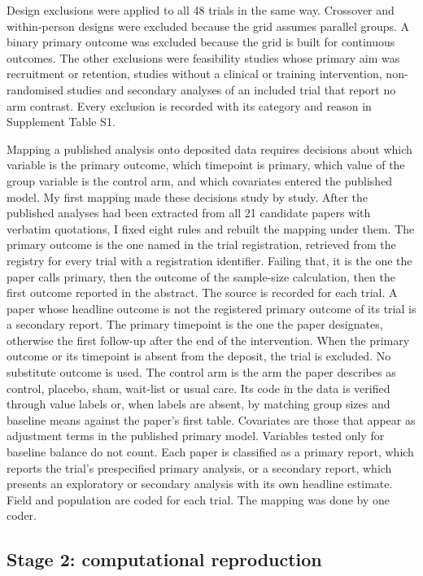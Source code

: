 Design exclusions were applied to all 48 trials in the same way. Crossover and within-person designs were excluded because the grid assumes parallel groups. A binary primary outcome was excluded because the grid is built for continuous outcomes. The other exclusions were feasibility studies whose primary aim was recruitment or retention, studies without a clinical or training intervention, non-randomised studies and secondary analyses of an included trial that report no arm contrast. Every exclusion is recorded with its category and reason in Supplement Table S1.

Mapping a published analysis onto deposited data requires decisions about which variable is the primary outcome, which timepoint is primary, which value of the group variable is the control arm, and which covariates entered the published model. My first mapping made these decisions study by study. After the published analyses had been extracted from all 21 candidate papers with verbatim quotations, I fixed eight rules and rebuilt the mapping under them. The primary outcome is the one named in the trial registration, retrieved from the registry for every trial with a registration identifier. Failing that, it is the one the paper calls primary, then the outcome of the sample-size calculation, then the first outcome reported in the abstract. The source is recorded for each trial. A paper whose headline outcome is not the registered primary outcome of its trial is a secondary report. The primary timepoint is the one the paper designates, otherwise the first follow-up after the end of the intervention. When the primary outcome or its timepoint is absent from the deposit, the trial is excluded. No substitute outcome is used. The control arm is the arm the paper describes as control, placebo, sham, wait-list or usual care. Its code in the data is verified through value labels or, when labels are absent, by matching group sizes and baseline means against the paper's first table. Covariates are those that appear as adjustment terms in the published primary model. Variables tested only for baseline balance do not count. Each paper is classified as a primary report, which reports the trial's prespecified primary analysis, or a secondary report, which presents an exploratory or secondary analysis with its own headline estimate. Field and population are coded for each trial. The mapping was done by one coder.

\subsection{Stage 2: computational reproduction}\label{stage-2-computational-reproduction}

